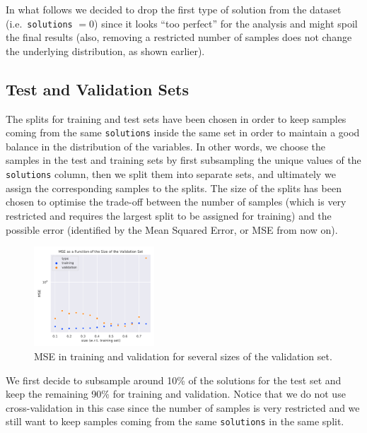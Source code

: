 In what follows we decided to drop the first type of solution from the dataset
(i.e.\ \texttt{solutions} $= 0$) since it looks ``too perfect'' for the
analysis and might spoil the final results (also, removing a restricted number
of samples does not change the underlying distribution, as shown earlier).

\subsection{Test and Validation Sets}\label{sec:reg:test_val}

The splits for training and test sets have been chosen in order to keep samples
coming from the same \texttt{solutions} inside the same set in order to
maintain a good balance in the distribution of the variables.
In other words, we choose the samples in the test and training sets by first
subsampling the unique values of the \texttt{solutions} column, then we split
them into separate sets, and ultimately we assign the corresponding samples to
the splits.
The size of the splits has been chosen to optimise the trade-off between the
number of samples (which is very restricted and requires the largest split to
be assigned for training) and the possible error (identified by the Mean
Squared Error, or MSE from now on).

\begin{figure}[htbp]
  \centering
  \includegraphics[width=0.4\textwidth]{img/training-validation-errors}
  \caption{MSE in training and validation for several sizes of the validation set.}
  \label{fig:reg:validation_size}
\end{figure}
We first decide to subsample around 10\% of the solutions for the test set and
keep the remaining 90\% for training and validation.
Notice that we do not use cross-validation in this case since the number of
samples is very restricted and we still want to keep samples coming from the
same \texttt{solutions} in the same split.

